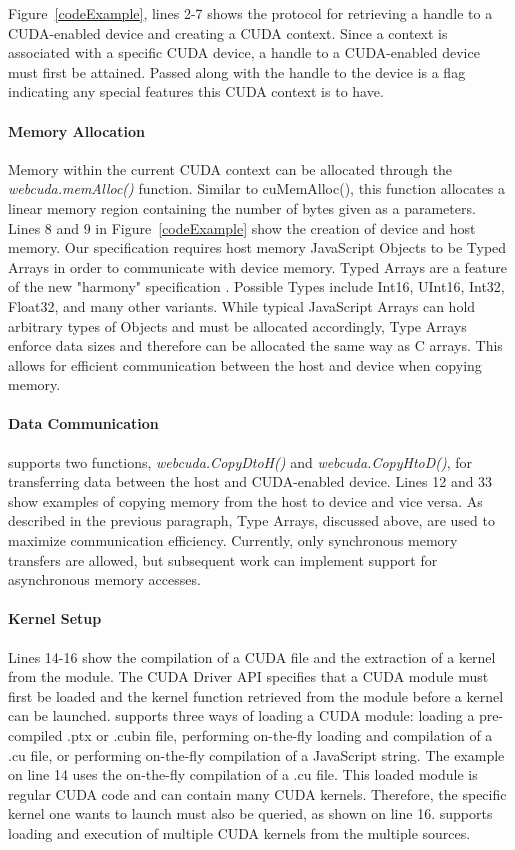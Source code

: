 Figure~\ref{codeExample}, lines 2-7 shows the protocol for
retrieving a handle to a CUDA-enabled device and creating a CUDA context. Since
a context is associated with a specific CUDA device, a handle to a CUDA-enabled
device must first be attained. Passed along with the handle to the device is a
flag indicating any special features this CUDA context is to have.

\paragraph{Memory Allocation} Memory within the current CUDA context can be
allocated through the \textit{webcuda.memAlloc()} function. Similar to
cuMemAlloc(), this function allocates a linear memory region containing the
number of bytes given as a parameters. Lines 8 and 9 in Figure~\ref{codeExample}
show the creation of device and host memory.  Our specification requires host
memory JavaScript Objects to be Typed Arrays \cite{typedarray} in order to communicate
with device memory. Typed Arrays are a feature of the new "harmony"
specification \cite{harmony}. Possible Types include Int16, UInt16, Int32, Float32, and many
other variants. While typical JavaScript Arrays can hold arbitrary types of Objects and must be
allocated accordingly, Type Arrays enforce data sizes and therefore can be
allocated the same way as C arrays. This allows for efficient communication
between the host and device when copying memory.


\paragraph{Data Communication} \name supports two functions,
\textit{webcuda.CopyDtoH()} and \textit{webcuda.CopyHtoD()}, for transferring
data between the host and CUDA-enabled device. Lines 12 and 33 show examples of
copying memory from the host to device and vice versa. As described in the
previous paragraph, Type Arrays, discussed above, are used to maximize
communication efficiency. Currently, only synchronous memory transfers are
allowed, but subsequent work can implement support for asynchronous memory
accesses.

\paragraph{Kernel Setup} Lines 14-16 show the compilation of a CUDA file and the
extraction of a kernel from the module. The CUDA Driver API specifies that a
CUDA module must first be loaded and the kernel function retrieved from the
module before a kernel can be launched. \name supports three ways of loading a
CUDA module: loading a pre-compiled .ptx or .cubin file, performing on-the-fly
loading and compilation of a .cu file, or performing on-the-fly compilation of a
JavaScript string.  The example on line 14 uses the on-the-fly compilation of a
.cu file. This loaded module is regular CUDA code and can contain many CUDA
kernels.  Therefore, the specific kernel one wants to launch must also be
queried, as shown on line 16. \name supports loading and execution of
multiple CUDA kernels from the multiple sources.

